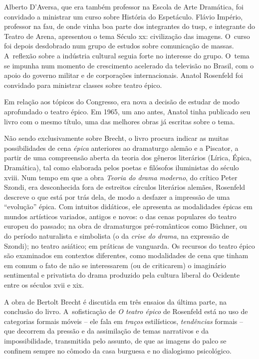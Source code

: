 Alberto D'Aversa, que era também professor na Escola de Arte Dramática,
foi convidado a ministrar um curso sobre História do Espetáculo.
Flávio Império, professor na {\sc fau}, de onde vinha boa parte dos
integrantes do {\sc tusp}, e integrante do Teatro de Arena, apresentou o tema
Século {\sc xx}: civilização das imagens. O~curso foi depois
desdobrado num grupo de estudos sobre comunicação de massas. A~reflexão
sobre a indústria cultural seguia forte no interesse do grupo. O~tema se
impunha num momento de crescimento acelerado da televisão no Brasil, com
o apoio do governo militar e de corporações internacionais. Anatol
Rosenfeld foi convidado para ministrar classes sobre teatro épico.

Em relação aos tópicos do Congresso, era nova a decisão de estudar de
modo aprofundado o teatro épico. Em 1965, um ano antes, Anatol
tinha publicado seu livro com o mesmo título, uma das melhores obras já
escritas sobre o tema.

Não sendo exclusivamente sobre Brecht, o livro procura indicar as muitas
possibilidades de cena {\it épica} anteriores ao dramaturgo alemão e a
Piscator, a partir de uma compreensão aberta da teoria dos gêneros
literários (Lírica, Épica, Dramática), tal como elaborada pelos poetas e
filósofos iluministas do século {\sc xviii}. Num tempo em que a obra
{\it Teoria do drama moderno}, do crítico Peter Szondi, era desconhecida
fora de estreitos círculos literários alemães, Rosenfeld descreve o que
está por trás dela, de modo a desfazer a impressão de uma “evolução”
épica. Com intuitos didáticos, ele apresenta as modalidades épicas em
mundos artísticos variados, antigos e novos: o das cenas populares do
teatro europeu do passado; na obra de dramaturgos pré-românticos como
Büchner, ou do período naturalista e simbolista (o da {\it crise do
drama}, na expressão de Szondi); no teatro asiático; em práticas de
vanguarda. Os recursos do teatro épico são examinados em contextos
diferentes, como modalidades de cena que tinham em comum o fato de não
se interessarem (ou de criticarem) o imaginário sentimental e privatista
do drama produzido pela cultura liberal do Ocidente entre os séculos
{\sc xvii} e {\sc xix}.

A obra de Bertolt Brecht é discutida em três ensaios da última parte, na
conclusão do livro. A~sofisticação de {\it O teatro épico} de Rosenfeld
está no uso de categorias formais móveis -- ele fala em {\it traços}
estilísticos, {\it tendências} formais -- que decorrem da pressão e da
assimilação de temas narrativos e da impossibilidade, transmitida pelo
assunto, de que as imagens do palco se confinem sempre no cômodo da casa
burguesa e no dialogismo psicológico.


